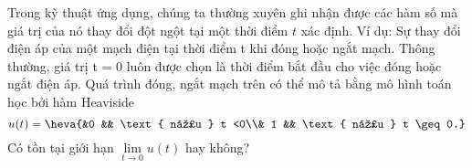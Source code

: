 \begin{bt}%
Trong kỹ thuật ứng dụng, chúng ta thường xuyên ghi nhận được các hàm số mà giá trị của nó thay đổi đột ngột tại một thời điểm $t$ xác định. Ví dụ:  Sự thay đổi điện áp của một mạch điện tại thời điểm t khi đóng hoặc ngắt mạch. Thông thường, giá trị t = 0 luôn được chọn là thời điểm bắt đầu cho việc đóng hoặc ngắt điện áp. Quá trình đóng, ngắt mạch trên có thể mô tả bằng mô hình toán học bởi hàm Heaviside
\[
u(t) = \heva{&0 && \text{ nếu } t <0\\& 1 && \text{ nếu } t \geq 0.}
\]
Có tồn tại giới hạn $\displaystyle \lim \limits_{t\to 0} u(t)$ hay không?
\end{bt}

